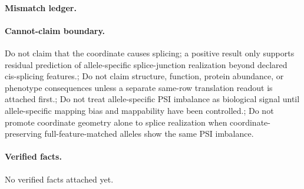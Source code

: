 \paragraph{Mismatch ledger.}
\paragraph{Cannot-claim boundary.} Do not claim that the coordinate causes splicing; a positive result only supports residual prediction of allele-specific splice-junction realization beyond declared cis-splicing features.; Do not claim structure, function, protein abundance, or phenotype consequences unless a separate same-row translation readout is attached first.; Do not treat allele-specific PSI imbalance as biological signal until allele-specific mapping bias and mappability have been controlled.; Do not promote coordinate geometry alone to splice realization when coordinate-preserving full-feature-matched alleles show the same PSI imbalance.

\paragraph{Verified facts.}
No verified facts attached yet.
